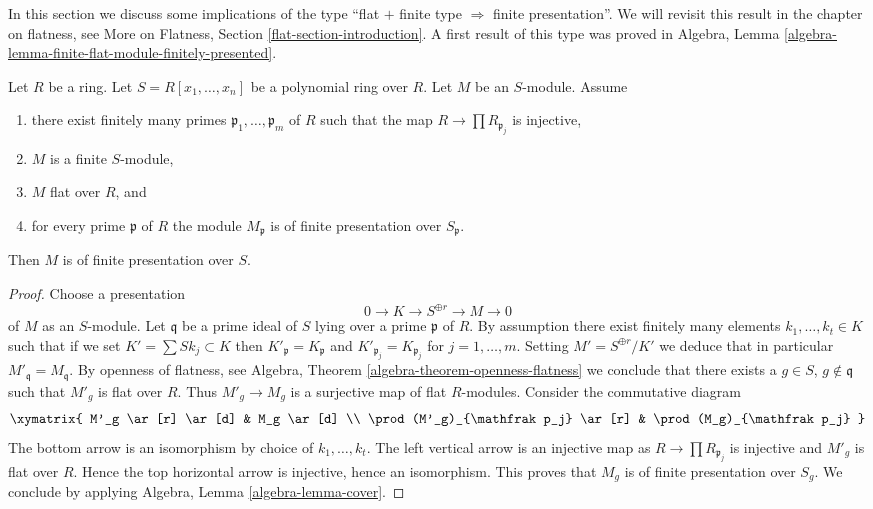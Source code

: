 \noindent
In this section we discuss some implications of the type
``flat $+$ finite type $\Rightarrow$ finite presentation''.
We will revisit this result in the chapter on flatness, see
More on Flatness, Section \ref{flat-section-introduction}.
A first result of this type was proved in
Algebra, Lemma \ref{algebra-lemma-finite-flat-module-finitely-presented}.

\begin{lemma}
\label{lemma-flat-finite-type-finite-presentation-local-module}
Let $R$ be a ring. Let $S = R[x_1, \ldots, x_n]$ be a polynomial
ring over $R$. Let $M$ be an $S$-module.
Assume
\begin{enumerate}
\item there exist finitely many primes $\mathfrak p_1, \ldots, \mathfrak p_m$
of $R$ such that the map $R \to \prod R_{\mathfrak p_j}$ is injective,
\item $M$ is a finite $S$-module,
\item $M$ flat over $R$, and
\item for every prime $\mathfrak p$ of $R$ the module $M_{\mathfrak p}$
is of finite presentation over $S_{\mathfrak p}$.
\end{enumerate}
Then $M$ is of finite presentation over $S$.
\end{lemma}

\begin{proof}
Choose a presentation
$$
0 \to K \to S^{\oplus r} \to M \to 0
$$
of $M$ as an $S$-module. Let $\mathfrak q$ be a prime ideal of $S$
lying over a prime $\mathfrak p$ of $R$. By assumption there exist
finitely many elements $k_1, \ldots, k_t \in K$ such that if we set
$K' = \sum Sk_j \subset K$ then
$K'_{\mathfrak p} = K_{\mathfrak p}$ and
$K'_{\mathfrak p_j} = K_{\mathfrak p_j}$ for $j = 1, \ldots, m$.
Setting $M' = S^{\oplus r}/K'$ we deduce that in particular
$M'_{\mathfrak q} = M_{\mathfrak q}$. By openness of flatness, see
Algebra, Theorem \ref{algebra-theorem-openness-flatness}
we conclude that there exists a $g \in S$, $g \not \in \mathfrak q$
such that $M'_g$ is flat over $R$. Thus $M'_g \to M_g$ is a surjective
map of flat $R$-modules. Consider the commutative diagram
$$
\xymatrix{
M'_g \ar[r] \ar[d] & M_g \ar[d] \\
\prod (M'_g)_{\mathfrak p_j} \ar[r] & \prod (M_g)_{\mathfrak p_j}
}
$$
The bottom arrow is an isomorphism by choice of $k_1, \ldots, k_t$.
The left vertical arrow is an injective map as
$R \to \prod R_{\mathfrak p_j}$ is injective and $M'_g$ is flat over $R$.
Hence the top horizontal arrow is injective, hence an isomorphism.
This proves that $M_g$ is of finite presentation over $S_g$.
We conclude by applying
Algebra, Lemma \ref{algebra-lemma-cover}.
\end{proof}

